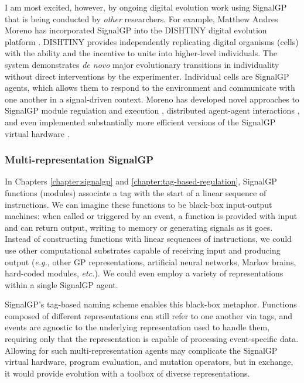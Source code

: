 
I am most excited, however, by ongoing digital evolution work using SignalGP that is being conducted by \textit{other} researchers. 
For example, Matthew Andres Moreno has incorporated SignalGP into the DISHTINY digital evolution platform \citep{moreno_toward_2019,Lalejini_Moreno_Ofria_DISHTINY_2020}.
DISHTINY provides independently replicating digital organisms (cells) with the ability and the incentive to unite into higher-level individuals.
The system demonstrates \textit{de novo} major evolutionary transitions in individuality without direct interventions by the experimenter. 
Individual cells are SignalGP agents, which allows them to respond to the environment and communicate with one another in a signal-driven context.
Moreno has developed novel approaches to SignalGP module regulation and execution \citep{Moreno_2021}, distributed agent-agent interactions \citep{Moreno_Ofria_2020}, and even implemented substantially more efficient versions of the SignalGP virtual hardware \citep{Moreno_Rodriguez-Papa_2021}. 

\subsubsection{Multi-representation SignalGP}

In Chapters \ref{chapter:signalgp} and \ref{chapter:tag-based-regulation}, SignalGP functions (modules) associate a tag with the start of a linear sequence of instructions. 
We can imagine these functions to be black-box input-output machines: when called or triggered by an event, a function is provided with input and can return output, writing to memory or generating signals as it goes. 
Instead of constructing functions with linear sequences of instructions, we could use other computational substrates capable of receiving input and producing output (\textit{e.g.}, other GP representations, artificial neural networks, Markov brains, hard-coded modules, \textit{etc.}). 
We could even employ a variety of representations within a single SignalGP agent. 

SignalGP's tag-based naming scheme enables this black-box metaphor. 
Functions composed of different representations can still refer to one another via tags, and events are agnostic to the underlying representation used to handle them, requiring only that the representation is capable of processing event-specific data. 
Allowing for such multi-representation agents may complicate the SignalGP virtual hardware, program evaluation, and mutation operators, but in exchange, it would provide evolution with a toolbox of diverse representations. 

